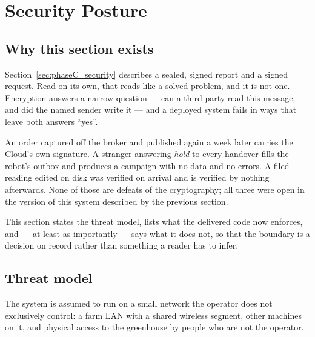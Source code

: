 \section{Security Posture}
\label{sec:security_posture}

\subsection{Why this section exists}

Section~\ref{sec:phaseC_security} describes a sealed, signed report and
a signed request. Read on its own, that reads like a solved problem, and
it is not one. Encryption answers a narrow question --- can a third
party read this message, and did the named sender write it --- and a
deployed system fails in ways that leave both answers ``yes''.

An order captured off the broker and published again a week later
carries the Cloud's own signature. A stranger answering \emph{hold} to
every handover fills the robot's outbox and produces a campaign with no
data and no errors. A filed reading edited on disk was verified on
arrival and is verified by nothing afterwards. None of those are defeats
of the cryptography; all three were open in the version of this system
described by the previous section.

This section states the threat model, lists what the delivered code now
enforces, and --- at least as importantly --- says what it does not, so
that the boundary is a decision on record rather than something a reader
has to infer.

\subsection{Threat model}

The system is assumed to run on a small network the operator does not
exclusively control: a farm LAN with a shared wireless segment, other
machines on it, and physical access to the greenhouse by people who are
not the operator.

